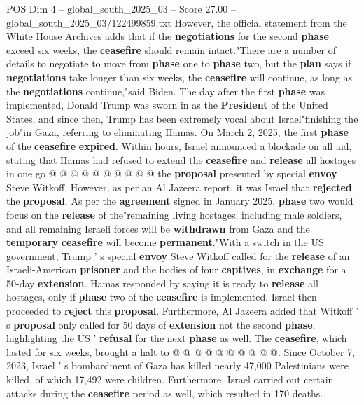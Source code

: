 \begin{textsample}{POS Dim 4 – global\_south\_2025\_03 – Score 27.00 – global\_south\_2025\_03/122499859.txt}
However, the official statement from the White House Archives adds that if the \textbf{negotiations} for the second \textbf{phase} exceed six weeks, the \textbf{ceasefire} should remain intact."There are a number of details to negotiate to move from \textbf{phase} one to \textbf{phase} two, but the \textbf{plan} says if \textbf{negotiations} take longer than six weeks, the \textbf{ceasefire} will continue, as long as the \textbf{negotiations} continue,"said Biden.
The day after the first \textbf{phase} was implemented, Donald Trump was sworn in as the \textbf{President} of the United States, and since then, Trump has been extremely vocal about Israel"finishing the job"in Gaza, referring to eliminating Hamas.
On March 2, 2025, the first \textbf{phase} of the \textbf{ceasefire} \textbf{expired}.
Within hours, Israel announced a blockade on all aid, stating that Hamas had refused to extend the \textbf{ceasefire} and \textbf{release} all hostages in one go @ @ @ @ @ @ @ @ @ @ the \textbf{proposal} presented by special \textbf{envoy} Steve Witkoff.
However, as per an Al Jazeera report, it was Israel that \textbf{rejected} the \textbf{proposal}.
As per the \textbf{agreement} signed in January 2025, \textbf{phase} two would focus on the \textbf{release} of the"remaining living hostages, including male soldiers, and all remaining Israeli forces will be \textbf{withdrawn} from Gaza and the \textbf{temporary} \textbf{ceasefire} will become \textbf{permanent}."With a switch in the US government, Trump ' s special \textbf{envoy} Steve Witkoff called for the \textbf{release} of an Israeli-American \textbf{prisoner} and the bodies of four \textbf{captives}, in \textbf{exchange} for a 50-day \textbf{extension}.
Hamas responded by saying it is ready to \textbf{release} all hostages, only if \textbf{phase} two of the \textbf{ceasefire} is implemented.
Israel then proceeded to \textbf{reject} this \textbf{proposal}.
Furthermore, Al Jazeera added that Witkoff ' s \textbf{proposal} only called for 50 days of \textbf{extension} not the second \textbf{phase}, highlighting the US ' \textbf{refusal} for the next \textbf{phase} as well.
The \textbf{ceasefire}, which lasted for six weeks, brought a halt to @ @ @ @ @ @ @ @ @ @.
Since October 7, 2023, Israel ' s bombardment of Gaza has killed nearly 47,000 Palestinians were killed, of which 17,492 were children.
Furthermore, Israel carried out certain attacks during the \textbf{ceasefire} period as well, which resulted in 170 deaths.

\end{textsample}
